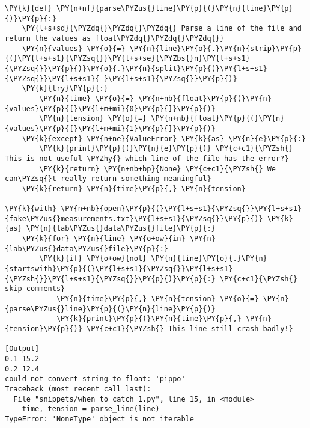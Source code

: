 \begin{Verbatim}[label=\makebox{\url{https://github.com/lucabaldini/cmepda/tree/master/slides/latex/snippets/when\_to\_catch\_1.py}},commandchars=\\\{\}]
\PY{k}{def} \PY{n+nf}{parse\PYZus{}line}\PY{p}{(}\PY{n}{line}\PY{p}{)}\PY{p}{:}
    \PY{l+s+sd}{\PYZdq{}\PYZdq{}\PYZdq{} Parse a line of the file and return the values as float\PYZdq{}\PYZdq{}\PYZdq{}}
    \PY{n}{values} \PY{o}{=} \PY{n}{line}\PY{o}{.}\PY{n}{strip}\PY{p}{(}\PY{l+s+s1}{\PYZsq{}}\PY{l+s+se}{\PYZbs{}n}\PY{l+s+s1}{\PYZsq{}}\PY{p}{)}\PY{o}{.}\PY{n}{split}\PY{p}{(}\PY{l+s+s1}{\PYZsq{}}\PY{l+s+s1}{ }\PY{l+s+s1}{\PYZsq{}}\PY{p}{)}
    \PY{k}{try}\PY{p}{:}
        \PY{n}{time} \PY{o}{=} \PY{n+nb}{float}\PY{p}{(}\PY{n}{values}\PY{p}{[}\PY{l+m+mi}{0}\PY{p}{]}\PY{p}{)}
        \PY{n}{tension} \PY{o}{=} \PY{n+nb}{float}\PY{p}{(}\PY{n}{values}\PY{p}{[}\PY{l+m+mi}{1}\PY{p}{]}\PY{p}{)}
    \PY{k}{except} \PY{n+ne}{ValueError} \PY{k}{as} \PY{n}{e}\PY{p}{:}
        \PY{k}{print}\PY{p}{(}\PY{n}{e}\PY{p}{)} \PY{c+c1}{\PYZsh{} This is not useful \PYZhy{} which line of the file has the error?}
        \PY{k}{return} \PY{n+nb+bp}{None} \PY{c+c1}{\PYZsh{} We can\PYZsq{}t really return something meaningful}
    \PY{k}{return} \PY{n}{time}\PY{p}{,} \PY{n}{tension}

\PY{k}{with} \PY{n+nb}{open}\PY{p}{(}\PY{l+s+s1}{\PYZsq{}}\PY{l+s+s1}{fake\PYZus{}measurements.txt}\PY{l+s+s1}{\PYZsq{}}\PY{p}{)} \PY{k}{as} \PY{n}{lab\PYZus{}data\PYZus{}file}\PY{p}{:}
    \PY{k}{for} \PY{n}{line} \PY{o+ow}{in} \PY{n}{lab\PYZus{}data\PYZus{}file}\PY{p}{:}
        \PY{k}{if} \PY{o+ow}{not} \PY{n}{line}\PY{o}{.}\PY{n}{startswith}\PY{p}{(}\PY{l+s+s1}{\PYZsq{}}\PY{l+s+s1}{\PYZsh{}}\PY{l+s+s1}{\PYZsq{}}\PY{p}{)}\PY{p}{:} \PY{c+c1}{\PYZsh{} skip comments}
            \PY{n}{time}\PY{p}{,} \PY{n}{tension} \PY{o}{=} \PY{n}{parse\PYZus{}line}\PY{p}{(}\PY{n}{line}\PY{p}{)}
            \PY{k}{print}\PY{p}{(}\PY{n}{time}\PY{p}{,} \PY{n}{tension}\PY{p}{)} \PY{c+c1}{\PYZsh{} This line still crash badly!}

[Output]
0.1 15.2
0.2 12.4
could not convert string to float: 'pippo'
Traceback (most recent call last):
  File "snippets/when_to_catch_1.py", line 15, in <module>
    time, tension = parse_line(line)
TypeError: 'NoneType' object is not iterable
\end{Verbatim}
